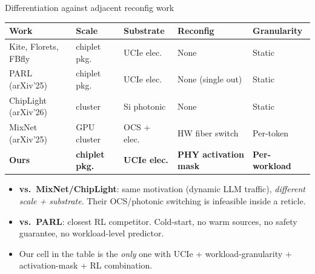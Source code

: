 \documentclass[aspectratio=169]{beamer}
\begin{document}
\begin{frame}{Differentiation against adjacent reconfig work}
\centering\scriptsize
\begin{tabular}{lllll}
\toprule
Work & Scale & Substrate & Reconfig & Granularity \\
\midrule
Kite, Florets, FBfly & chiplet pkg.\ & UCIe elec.\        & None               & Static \\
PARL (arXiv'25)      & chiplet pkg.\ & UCIe elec.\        & None (single out)  & Static \\
ChipLight (arXiv'26) & cluster       & Si photonic        & None               & Static \\
MixNet (arXiv'25)    & GPU cluster   & OCS + elec.\       & HW fiber switch    & Per-token \\
\textbf{Ours}        & \textbf{chiplet pkg.} & \textbf{UCIe elec.}
                     & \textbf{PHY activation mask} & \textbf{Per-workload} \\
\bottomrule
\end{tabular}

\medskip
\normalsize
\begin{itemize}\small
  \item \textbf{vs.\ MixNet/ChipLight}: same motivation
        (dynamic LLM traffic), \emph{different scale + substrate}.
        Their OCS/photonic switching is infeasible inside a reticle.
  \item \textbf{vs.\ PARL}: closest RL competitor. Cold-start, no warm sources,
        no safety guarantee, no workload-level predictor.
  \item Our cell in the table is the \emph{only} one with
        UCIe + workload-granularity + activation-mask + RL combination.
\end{itemize}
\end{frame}
\end{document}
